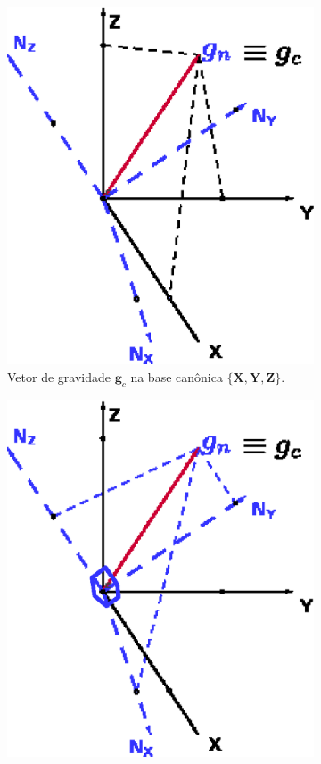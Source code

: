 \documentclass[a4paper,10pt]{report}
\begin{document}
\begin{figure}[h!]
\centering
  \begin{subfigure}[b]{0.35\textwidth}
  \includegraphics[width=\textwidth]{images/ejes2.eps} 
  \caption{Vetor de gravidade $\mathbf{g}_c$ na base canônica $\{\mathbf{X},\mathbf{Y},\mathbf{Z}\}$.}
  \label{fig:ejes2}
  \end{subfigure}
  \begin{subfigure}[b]{0.35\textwidth}
  \includegraphics[width=\textwidth]{images/ejes.eps} 

\end{subfigure}
\end{figure}
\end{document}
